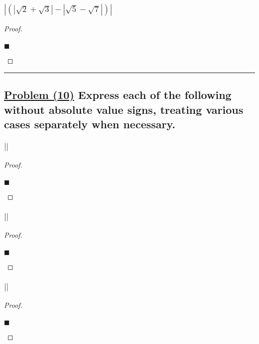\documentclass[letterpaper, 10 pt, conference]{ieeeconf}  %
\begin{document}
\subsubsection{\textbf{$\left\lvert (\left\lvert \sqrt{2} + \sqrt{3} \right\rvert - \left\lvert \sqrt{5} - \sqrt{7} \right\rvert) \right\rvert$}}
\begin{proof}
\begin{align}
    
\end{align}
\begin{flushright}
$\blacksquare$
\end{flushright}
\end{proof}

\noindent\rule{8cm}{0.4pt}
\subsection{\textbf{\underline{Problem (10)} Express each of the following without absolute value signs, treating various cases separately when necessary.}}

\subsubsection{\textbf{$\left\lvert \right\rvert$}}
\begin{proof}
\begin{align}
    
\end{align}
\begin{flushright}
$\blacksquare$
\end{flushright}
\end{proof}

\subsubsection{\textbf{$\left\lvert \right\rvert$}}
\begin{proof}
\begin{align}
    
\end{align}
\begin{flushright}
$\blacksquare$
\end{flushright}
\end{proof}

\subsubsection{\textbf{$\left\lvert \right\rvert$}}
\begin{proof}
\begin{align}
    
\end{align}
\begin{flushright}
$\blacksquare$
\end{flushright}
\end{proof}
\end{document}
